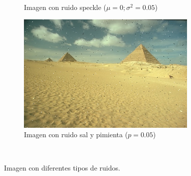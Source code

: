 \begin{figure}
{\begin{subfigure}[b]{0.4\textwidth}
			\caption{Imagen con ruido speckle ($\mu = 0; \sigma^2 = 0.05$)}
			\label{fig:con_ruido_speckle}
		\end{subfigure}
			\begin{subfigure}[b]{0.4\textwidth}
				\centering
				\includegraphics[width=0.95\textwidth]{fig/img_salt_and_pepper_noise.jpg}
				\caption{Imagen con ruido sal y pimienta ($p = 0.05$)}
				\label{fig:con_ruido_sal_y_pimienta}
			\end{subfigure}
	}\\
	\caption{Imagen con diferentes tipos de ruidos.} \label{fig:ruido}
\end{figure}








